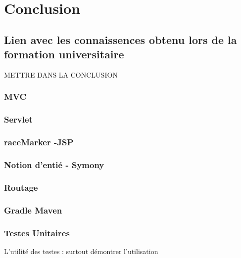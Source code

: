 \chapter{Conclusion}




\section{Lien avec les connaissences obtenu lors de la formation universitaire}
METTRE DANS LA CONCLUSION
\subsection{MVC}
\subsection{Servlet}
\subsection{raeeMarker -JSP}
\subsection{Notion d'entié - Symony}
\subsection{Routage}
\subsection{Gradle Maven}
\subsection{Testes Unitaires}
L'utilité des testes : surtout démontrer l'utilisation 
